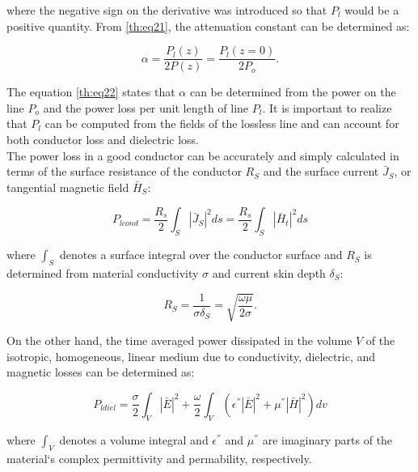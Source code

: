 \noindent where the negative sign on the derivative was introduced so that $P_{l}$ would be a positive quantity. From \ref{th:eq21}, the attenuation constant can be determined as:

\begin{equation}\label{th:eq22}
\alpha =\frac{P_{l}(z)}{2P(z)}=\frac{P_{l}(z=0)}{2P_{o}}.
\end{equation}

\noindent The equation \ref{th:eq22} states that $\alpha $ can be determined from the power on the line $P_{o}$ and the power loss per unit length of line $P_{l}$. It is important to realize that $P_{l}$ can be computed from the fields of the lossless line and can account for both conductor loss %
and dielectric loss. %
\\
\indent The power loss in a good conductor can be accurately and simply calculated in terms of the surface resistance of the conductor $R_{S}$ and the surface current $\bar{J}_{S}$, or tangential magnetic field $\bar{H}_{S}$:

\begin{equation}\label{th:eq23}
P_{lcond} =\frac{R_{s}}{2}\int_{S}|\bar{J}_{S}|^{2}ds=\frac{R_{s}}{2}\int_{S}|\bar{H}_{t}|^{2}ds
\end{equation}

\noindent where $\int_{S}$ denotes a surface integral over the conductor surface and $R_{S}$ is determined from material conductivity $\sigma $ and current skin depth $\delta _{S}$:

\begin{equation}\label{th:eq24}
R_{S} =\frac{1}{\sigma \delta _{S}}=\sqrt{\frac{\omega \mu}{2\sigma}}.
\end{equation}

\indent On the other hand, the time averaged power dissipated in the volume $V$ of the isotropic, homogeneous, linear medium due to conductivity, dielectric, and magnetic losses can be determined as:

\begin{equation}\label{th:eq25}
P_{ldiel} =\frac{\sigma}{2}\int_{V}|\bar{E}|^{2}+\frac{\omega}{2}\int_{V}(\epsilon ^{''}|\bar{E}|^{2}+\mu ^{''}|\bar{H}|^{2})dv
\end{equation}

\noindent where $\int_{V}$ denotes a volume integral and $\epsilon ^{''}$ and $\mu ^{''}$ are imaginary parts of the material`s complex permittivity and permability, respectively.



